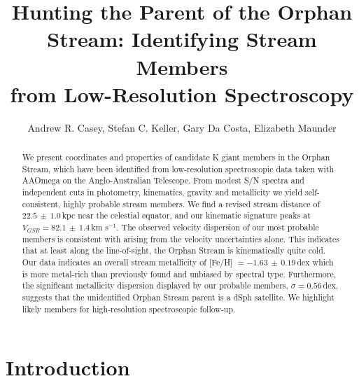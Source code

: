 \documentclass[10pt,apjl]{emulateapj}
\begin{document}


\title{Hunting the Parent of the Orphan Stream: Identifying Stream Members \\ from Low-Resolution Spectroscopy}

\author{Andrew R. Casey, Stefan C. Keller, Gary Da Costa, Elizabeth Maunder}

\begin{abstract}
We present coordinates and properties of candidate K giant members in the Orphan Stream, which have been identified from low-resolution spectroscopic data taken with AAOmega on the Anglo-Australian Telescope. From modest S/N spectra and independent cuts in photometry, kinematics, gravity and metallicity we yield self-consistent, highly probable stream members. We find a revised stream distance of $22.5\,\pm\,1.0$\,kpc near the celestial equator, and our kinematic signature peaks at $V_{GSR} = 82.1\,\pm\,1.4$\,km s$^{-1}$. The observed velocity dispersion of our most probable members is consistent with arising from the velocity uncertainties alone. This indicates that at least along the line-of-sight, the Orphan Stream is kinematically quite cold. Our data indicates an overall stream metallicity of [Fe/H] $= -1.63\,\pm\,0.19$\,dex which is more metal-rich than previously found and unbiased by spectral type. Furthermore, the significant metallicity dispersion displayed by our probable members, $\sigma = 0.56$\,dex, suggests that the unidentified Orphan Stream parent is a dSph satellite. We highlight likely members for high-resolution spectroscopic follow-up.
\end{abstract}


\section{Introduction}
\label{sec:introduction}
\end{document}

